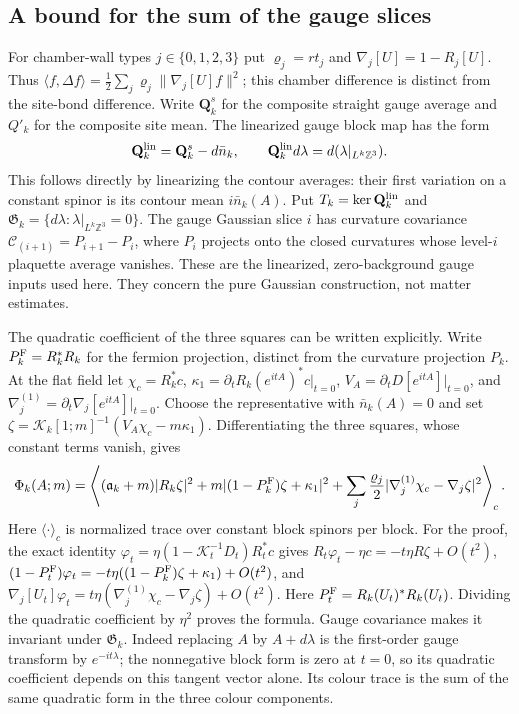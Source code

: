 \documentclass[11pt,letterpaper,reqno]{amsart}
\theoremstyle{definition}
\theoremstyle{remark}
\begin{document}
\subsection{A bound for the sum of the gauge slices}

For chamber-wall types $j\in\{0,1,2,3\}$ put
$\varrho_j=rt_j$ and $\nabla_j[U]=1-R_j[U]$.
Thus $\langle f,\Delta f\rangle
=\tfrac12\sum_j\varrho_j\|\nabla_j[U]f\|^2$;
this chamber difference is distinct from the site-bond difference.
Write $\mathbf Q_k^s$ for the composite straight gauge average and
$Q'_k$ for the composite site mean.  The linearized gauge block
map has the form
\[
 \mathbf Q_k^{\rm lin}=\mathbf Q_k^s-d\bar n_k,
 \qquad \mathbf Q_k^{\rm lin}d\lambda
                  =d(\lambda|_{L^k\mathbb Z^3}).
\]
This follows directly by linearizing the contour averages: their
first variation on a constant spinor is its contour mean
$i\bar n_k(A)$.  Put $T_k=\ker\mathbf Q_k^{\rm lin}$ and
$\mathfrak G_k=\{d\lambda:\lambda|_{L^k\mathbb Z^3}=0\}$.
The gauge Gaussian slice $i$ has curvature covariance
$\mathcal C_{(i+1)}=P_{i+1}-P_i$, where $P_i$ projects onto
the closed curvatures whose level-$i$ plaquette average vanishes.
These are the linearized, zero-background gauge inputs used here.
They concern the pure Gaussian construction, not matter estimates.

The quadratic coefficient of the three squares can be written
explicitly. Write $P_k^{\rm F}=R_k^*R_k$ for the fermion
projection, distinct from the curvature projection $P_k$.
At the flat field let $\chi_c=R_k^*c$,
$\kappa_1=\partial_tR_k(e^{itA})^*c|_{t=0}$,
$V_A=\partial_tD[e^{itA}]|_{t=0}$, and
$\nabla_j^{(1)}=\partial_t\nabla_j[e^{itA}]|_{t=0}$.
Choose the representative with $\bar n_k(A)=0$ and set
$\zeta=\mathcal K_k[1;m]^{-1}(V_A\chi_c-m\kappa_1)$.
Differentiating the three squares, whose constant terms vanish,
gives
\[
 \Phi_k(A;m)=\left\langle
 (\mathfrak a_k+m)|R_k\zeta|^2+
 m|(1-P_k^{\rm F})\zeta+\kappa_1|^2+
 \sum_j\frac{\varrho_j}2
        |\nabla_j^{(1)}\chi_c-\nabla_j\zeta|^2
 \right\rangle_c.
\]
Here $\langle\cdot\rangle_c$ is normalized trace over constant
block spinors per block.  For the proof, the exact identity
$\varphi_t=\eta(1-\mathcal K_t^{-1}D_t)R_t^*c$ gives
$R_t\varphi_t-\eta c=-t\eta R\zeta+O(t^2)$,
$(1-P_t^{\rm F})\varphi_t=-t\eta((1-P_k^{\rm F})\zeta+\kappa_1)+O(t^2)$,
and $\nabla_j[U_t]\varphi_t=
t\eta(\nabla_j^{(1)}\chi_c-\nabla_j\zeta)+O(t^2)$.
Here $P_t^{\rm F}=R_k(U_t)^*R_k(U_t)$.
Dividing the quadratic coefficient by $\eta^2$ proves the formula.
Gauge covariance makes it invariant under $\mathfrak G_k$.
Indeed replacing $A$ by $A+d\lambda$ is the first-order gauge
transform by $e^{-it\lambda}$; the nonnegative block form is
zero at $t=0$, so its quadratic coefficient depends on this
tangent vector alone.  Its colour trace is the sum of the same
quadratic form in the three colour components.
\end{document}
